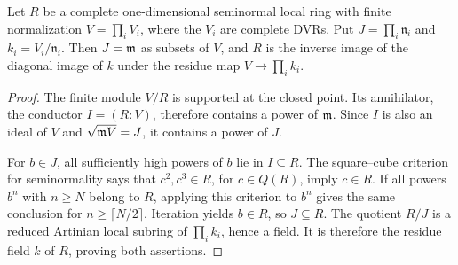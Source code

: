 \begin{lemma}\label{conductor-description}
Let $R$ be a complete one-dimensional seminormal local ring with finite
normalization $V=\prod_iV_i$, where the $V_i$ are complete DVRs.  Put
$J=\prod_i\mathfrak n_i$ and $k_i=V_i/\mathfrak n_i$.  Then $J=\mathfrak m$
as subsets of $V$, and $R$ is the inverse image of the diagonal image
of $k$ under the residue map $V\to\prod_i k_i$.
\end{lemma}
\begin{proof}
The finite module $V/R$ is supported at the closed point.  Its
annihilator, the conductor $I=(R:V)$, therefore contains a power of
$\mathfrak m$.  Since $I$ is also an ideal of $V$ and $\sqrt{\mathfrak m V}=J$, it
contains a power of $J$.

For $b\in J$, all sufficiently high powers of $b$ lie in $I\subseteq R$.
The square--cube criterion for seminormality \cite{Swan} says that
$c^2,c^3\in R$, for $c\in Q(R)$, imply $c\in R$.  If all powers $b^n$
with $n\geq N$ belong to $R$, applying this criterion to $b^n$ gives
the same conclusion for $n\geq\lceil N/2\rceil$.  Iteration yields
$b\in R$, so $J\subseteq R$.  The quotient $R/J$ is a reduced Artinian
local subring of $\prod_i k_i$, hence a field.  It is therefore the
residue field $k$ of $R$, proving both assertions.
\end{proof}

